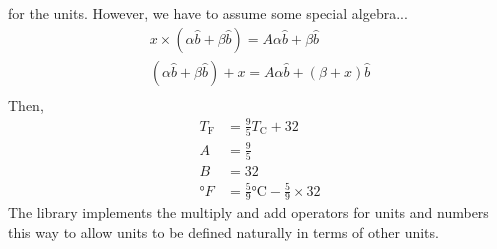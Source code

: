 \documentclass[letterpaper,10pt]{article}
\begin{document}
for the units.
However,
we have to assume some special algebra...
\begin{align}
        x \times (\alpha \hat{b} + \beta \hat{b}) = A\alpha \hat{b} + \beta \hat{b} \\
        (\alpha \hat{b} + \beta \hat{b}) + x = A\alpha \hat{b} + (\beta + x) \hat{b} \\
\end{align}
Then,
\begin{align}
        T_\text{F} &= \frac{9}{5} T_\text{C} + 32 \\
        A &= \frac{9}{5} \\
        B &= 32 \\
        \si{\degree F} &= \frac{5}{9} \si{\celsius} - \frac{5}{9} \times 32 
\end{align}
The library implements the multiply and add operators for units and numbers this way to allow units to be defined naturally in terms of other units.


\end{document}
